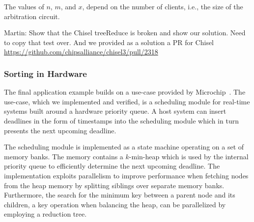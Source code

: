 \documentclass[conference]{IEEEtran}
\newcommand{\martin}[1]{{\color{blue} Martin: #1}}
\begin{document}
The values of $n$, $m$, and $x$, depend on the number of clients, i.e., the size of the arbitration
circuit.

\martin{Show that the Chisel treeReduce is broken and show our solution. Need to copy that test
over. And we provided as a solution a PR for Chisel \url{https://github.com/chipsalliance/chisel3/pull/2318}}

\subsubsection{Sorting in Hardware}


The final application example builds on a use-case provided
by Microchip~\cite{microchip}. The use-case, which we implemented and verified, is a scheduling module for real-time systems built around a hardware priority queue.
A host system can insert deadlines in the form of timestamps into the scheduling module which in turn presents the next upcoming deadline.

The scheduling module is implemented as a state machine 
operating on a set of memory banks. The memory contains a $k$-min-heap which is used by the internal priority queue to efficiently determine the next upcoming deadline. The implementation exploits parallelism to improve performance when fetching nodes from the heap memory by splitting siblings over separate memory banks. Furthermore, the search for the minimum key between a parent node and its children, a key operation when balancing the heap, can be parallelized by employing a reduction tree.






\end{document}

